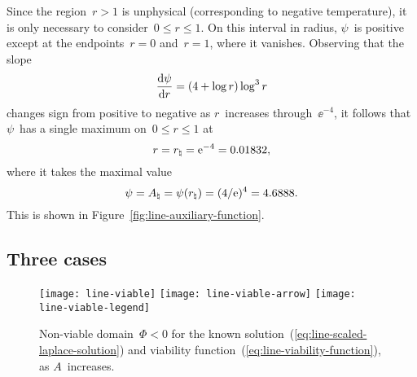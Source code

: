 Since the region~$r > 1$ is unphysical
(corresponding to negative temperature),
it is only necessary to consider~$0 \le r \le 1$.
On this interval in radius, $\psi$~is positive
except at the endpoints~$r = 0$ and~$r = 1$, where it vanishes.
Observing that the slope
\begin{equation}
  \tder{\psi}{r} = (4 + \log r) \log^3 r
  \label{eq:line-psi-r-derivative}
\end{equation}
changes sign from positive to negative
as $r$~increases through~$\ee^{-4}$,
it follows that $\psi$~has a single maximum on~$0 \le r \le 1$ at
\begin{equation}
  r = r_\natural = \mathrm{e}^{-4} = 0.01832,
  \label{eq:line-r-natural}
\end{equation}
where it takes the maximal value
\begin{equation}
  \psi
  = A_\natural
  = \psi (r_\natural)
  = (4 / \mathrm{e})^4
  = 4.6888.
  \label{eq:line-a-natural}
\end{equation}
This is shown in Figure~\ref{fig:line-auxiliary-function}.

\subsection{Three cases}
\label{sec:polar.viable.cases}

\begin{figure}
  \newcommand*{\figurewidth}{0.85\textwidth}
  \centering
  \texttt{[image: line-viable]}
  \texttt{[image: line-viable-arrow]}
  \texttt{[image: line-viable-legend]}
  \caption{
    Non-viable domain~$\Phi < 0$
    for the known solution~(\ref{eq:line-scaled-laplace-solution})
    and viability function~(\ref{eq:line-viability-function}),
    as $A$~increases.
  }
  \label{fig:line-viable}
\end{figure}

